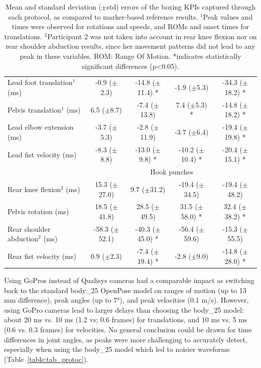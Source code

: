\begin{table}[!ht]
{\begin{tabular}{lcccc}
          Lead foot translation\(^1\) (ms) & -0.9 ($\pm$2.3) & -14.8 ($\pm$11.4) * & -1.9 ($\pm$5.3) & -34.3 ($\pm$18.2) * \\
          Pelvis translation\(^1\) (ms) & 6.5 ($\pm$8.7) & -7.4 ($\pm$13.8) & 7.4 ($\pm$5.3) * & -14.8 ($\pm$18.2) * \\
          Lead elbow extension (ms) & -3.7 ($\pm$5.3) & -2.8 ($\pm$11.9) & -3.7 ($\pm$6.4) & -19.4 ($\pm$19.8) * \\
          Lead fist velocity (ms)& -8.3 ($\pm$8.8) & -13.0 ($\pm$9.8) * & -10.2 ($\pm$10.4) * & -20.4 ($\pm$15.1) * \\
          \cmidrule(l{2pt}r{2pt}){2-5}
          ~ & \multicolumn{4}{c}{Hook punches} \\
          \cmidrule(l{2pt}r{2pt}){2-5}
          Rear knee flexion\(^2\) (ms) & 15.3 ($\pm$27.0) & 9.7 ($\pm$31.2) & -19.4 ($\pm$34.5) & -19.4 ($\pm$48.2) \\
          Pelvis rotation (ms) & 18.5 ($\pm$41.8) & 28.5 ($\pm$49.5) & 31.5 ($\pm$58.0) * & 32.4 ($\pm$38.2) * \\
          Rear shoulder abduction\(^2\) (ms) & -58.3 ($\pm$52.1) & -40.3 ($\pm$45.0) * & -56.4 ($\pm$59.6) & -15.3 ($\pm$55.5) \\
          Rear fist velocity (ms) & 0.9 ($\pm$2.3) & -7.4 ($\pm$19.4) * & -2.8 ($\pm$9.0) & -14.8 ($\pm$28.0) * \\
          \bottomrule
      \end{tabular}}
      \caption{Mean and standard deviation ($\pm$std) errors of the boxing KPIs captured through each protocol, as compared to marker-based reference results. \(^1\)Peak values and times were observed for rotations and speeds, and ROMs and onset times for translations. \(^2\)Participant 2 was not taken into account in rear knee flexion nor on rear shoulder abduction results, since her movement patterns did not lead to any peak in these variables.  ROM: Range Of Motion. *indicates statistically significant differences (p<0.05).}
      \label{table:tab_peakboxe}
\end{table}


Using GoPros instead of Qualisys cameras had a comparable impact as switching back to the standard body\_25 OpenPose model on ranges of motion (up to 13 mm difference), peak angles (up to 7°), and peak velocities (0.1 m/s). However, using GoPro cameras lead to larger delays than choosing the body\_25 model: about 20 ms vs. 10 ms (1.2 vs; 0.6 frames) for translations, and 10 ms vs. 5 ms (0.6 vs. 0.3 frames) for velocities. No general conclusion could be drawn for time differences in joint angles, as peaks were more challenging to accurately detect, especially when using the body\_25 model which led to noisier waveforms (Table~\ref{table:tab_protoc}).

